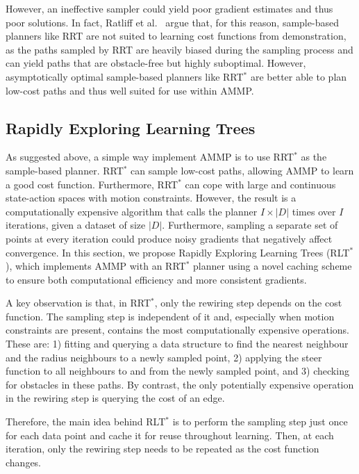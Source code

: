 \documentclass{article}  %
\begin{document}
However, an ineffective sampler could yield poor gradient estimates and thus poor solutions. In fact, Ratliff et al.\ \cite{ratliff2009chomp} argue that, for this reason, sample-based planners like RRT are not suited to learning cost functions from demonstration, as the paths sampled by RRT are heavily biased during the sampling process and can yield paths that are obstacle-free but highly suboptimal. However, asymptotically optimal sample-based planners like RRT$^*$ are better able to plan low-cost paths \cite{karaman2011sampling} and thus well suited for use within AMMP.

\subsection{Rapidly Exploring Learning Trees \label{subsec:cached}}

As suggested above, a simple way implement AMMP is to use RRT$^*$ as the sample-based planner.  RRT$^*$ can sample low-cost paths, allowing AMMP to learn a good cost function. Furthermore, RRT$^*$ can cope with large and continuous state-action spaces with motion constraints. However, the result is a computationally expensive algorithm that calls the planner $I\times|D|$ times over $I$ iterations, given a dataset of size $|D|$. Furthermore, sampling a separate set of points at every iteration could produce noisy gradients that negatively affect convergence. In this section, we propose Rapidly Exploring Learning Trees (RLT$^*$), which implements AMMP with an RRT$^*$ planner using a novel caching scheme to ensure both computational efficiency and more consistent gradients.

A key observation is that, in RRT$^*$, only the rewiring step depends on the cost function.  The sampling step is independent of it and, especially when motion constraints are present, contains the most computationally expensive operations. These are: 1) fitting and querying a data structure to find the nearest neighbour and the radius neighbours to a newly sampled point, 2) applying the steer function to all neighbours to and from the newly sampled point, and 3) checking for obstacles in these paths. By contrast,  the only potentially expensive operation in the rewiring step is querying the cost of an edge. 

Therefore, the main idea behind RLT$^*$ is to perform the sampling step just once for each data point and cache it for reuse throughout learning.  Then, at each iteration, only the rewiring step needs to be repeated as the cost function changes.
\end{document}
